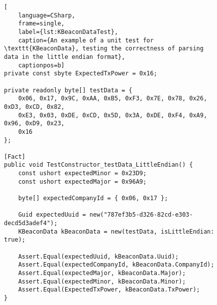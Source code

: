 \begin{figure}[H]
\begin{lstlisting}[
	language=CSharp, 
	frame=single, 
	label={lst:KBeaconDataTest},
	caption={An example of a unit test for \texttt{KBeaconData}, testing the correctness of parsing data in the little endian format}, 
	captionpos=b] 
private const sbyte ExpectedTxPower = 0x16;
	
private readonly byte[] testData = { 
	0x06, 0x17, 0x9C, 0xAA, 0xB5, 0xF3, 0x7E, 0x78, 0x26, 0xD3, 0xCD, 0x82,
	0xE3, 0x03, 0xDE, 0xCD, 0x5D, 0x3A, 0xDE, 0xF4, 0xA9, 0x96, 0xD9, 0x23, 
	0x16 
};

[Fact]
public void TestConstructor_testData_LittleEndian() {
	const ushort expectedMinor = 0x23D9;
	const ushort expectedMajor = 0x96A9;

	byte[] expectedCompanyId = { 0x06, 0x17 };

	Guid expectedUuid = new("787ef3b5-d326-82cd-e303-decd5d3adef4");
	KBeaconData kBeaconData = new(testData, isLittleEndian: true);

	Assert.Equal(expectedUuid, kBeaconData.Uuid);
	Assert.Equal(expectedCompanyId, kBeaconData.CompanyId);
	Assert.Equal(expectedMajor, kBeaconData.Major);
	Assert.Equal(expectedMinor, kBeaconData.Minor);
	Assert.Equal(ExpectedTxPower, kBeaconData.TxPower);
}
\end{lstlisting}
\end{figure}